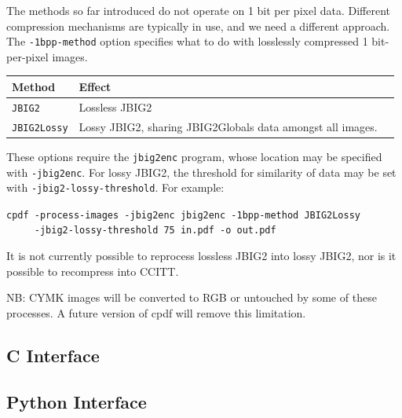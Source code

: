 \documentclass{book}
\begin{document}
\noindent The methods so far introduced do not operate on 1 bit per pixel data. Different compression mechanisms are typically in use, and we need a different approach. The \texttt{-1bpp-method} option specifies what to do with losslessly compressed 1 bit-per-pixel images.

\bigskip
\begin{tabular}{lp{10cm}l}
Method & Effect\\\hline
{\small\texttt{JBIG2}} & Lossless JBIG2 \\
{\small\texttt{JBIG2Lossy}} & Lossy JBIG2, sharing JBIG2Globals data amongst all images.
\end{tabular}
\bigskip

\noindent These options require the \texttt{jbig2enc} program, whose location may be specified with \texttt{-jbig2enc}. For lossy JBIG2, the threshold for similarity of data may be set with \texttt{-jbig2-lossy-threshold}. For example:

  \begin{framed}
  \noindent\small\verb!cpdf -process-images -jbig2enc jbig2enc -1bpp-method JBIG2Lossy!\\
  \noindent\small\verb!     -jbig2-lossy-threshold 75 in.pdf -o out.pdf!
  \end{framed}

\noindent It is not currently possible to reprocess lossless JBIG2 into lossy JBIG2, nor is it possible to recompress into CCITT.

NB: CYMK images will be converted to RGB or untouched by some of these processes. A future version of cpdf will remove this limitation.

\begin{cpdflib}
\clearpage
\section*{C Interface}
\begin{small}\tt

\end{small}
\end{cpdflib}

\begin{pycpdflib}
\clearpage
\section*{Python Interface}
\begin{small}\tt

\end{small}
\end{pycpdflib}
\pagestyle{fancy}
\end{document}
